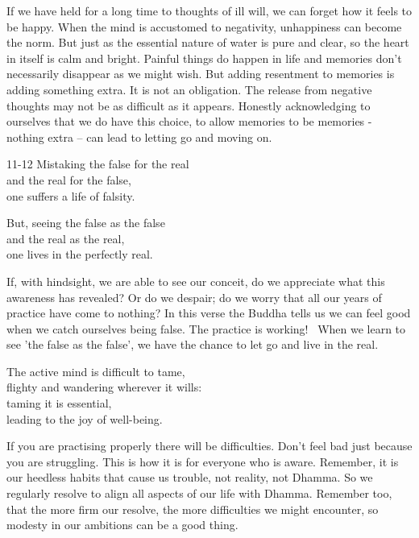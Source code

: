 \begin{dhpRefl}
If we have held for a long time to thoughts of ill will, we can forget how it feels to be happy. When the mind is accustomed to negativity, unhappiness can become the norm. But just as the essential nature of water is pure and clear, so the heart in itself is calm and bright. Painful things do happen in life and memories don't necessarily disappear as we might wish. But adding resentment to memories is adding something extra. It is not an obligation. The release from negative thoughts may not be as difficult as it appears. Honestly acknowledging to ourselves that we do have this choice, to allow memories to be memories - nothing extra – can lead to letting go and moving on.
\end{dhpRefl}


\begin{dhpVerse}{11-12}
\label{dhp-11}\label{dhp-12}
Mistaking the false for the real\\
and the real for the false,\\
one suffers a life of falsity.

But, seeing the false as the false\\
and the real as the real,\\
one lives in the perfectly real.
\end{dhpVerse}

\begin{dhpRefl}
If, with hindsight, we are able to see our conceit, do we appreciate what this awareness has revealed? Or do we despair; do we worry that all our years of practice have come to nothing? In this verse the Buddha tells us we can feel good when we catch ourselves being false. The practice is working!  When we learn to see 'the false as the false', we have the chance to let go and live in the real.
\end{dhpRefl}


\begin{dhpVerse}{35}
\label{dhp-35}
The active mind is difficult to tame,\\
flighty and wandering wherever it wills:\\
taming it is essential,\\
leading to the joy of well-being.
\end{dhpVerse}

\begin{dhpRefl}
If you are practising properly there will be difficulties. Don't feel bad just because you are struggling. This is how it is for everyone who is aware. Remember, it is our heedless habits that cause us trouble, not reality, not Dhamma. So we regularly resolve to align all aspects of our life with Dhamma. Remember too, that the more firm our resolve, the more difficulties we might encounter, so modesty in our ambitions can be a good thing.
\end{dhpRefl}

